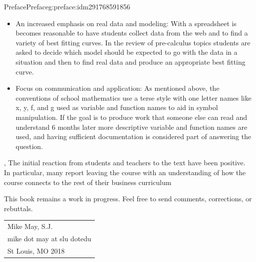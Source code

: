 \documentclass[oneside,10pt,]{book}
\numberwithin{equation}{section}
\begin{document}
\begin{preface}{Preface}{}{Preface}{}{}{g:preface:idm291768591856}
\begin{itemize}[label=\textbullet]
\item{}An increased emphasis on real data and modeling: With a spreadsheet is becomes reasonable to have students collect data from the web and to find a variety of best fitting curves. In the review of pre-calculus topics students are asked to decide which model should be expected to go with the data in a situation and then to find real data and produce an appropriate best fitting curve.%
\item{}Focus on communication and application: As mentioned above, the conventions of school mathematics use a terse style with one letter names like x, y, f, and g used as variable and function names to aid in symbol manipulation. If the goal is to produce work that someone else can read and understand 6 months later more descriptive variable and function names are used, and having sufficient documentation is considered part of answering the question.%
\end{itemize}
 , The initial reaction from students and teachers to the text have been positive.  In particular, many report leaving the course with an understanding of how the course connects to the rest of their business curriculum%
\par
This book remains a work in progress.  Feel free to send comments, corrections, or rebuttals.%
\nopagebreak\par%
\hfill\begin{tabular}[t]{l@{}}
Mike May, S.J.\\
mike dot may at slu dotedu\\
St Louis, MO 2018
\end{tabular}\\\par
\end{preface}
\setcounter{tocdepth}{1}
\renewcommand*\contentsname{Contents}
\tableofcontents
\mainmatter
%
%
\typeout{************************************************}
\typeout{************************************************}
%
\end{document}
